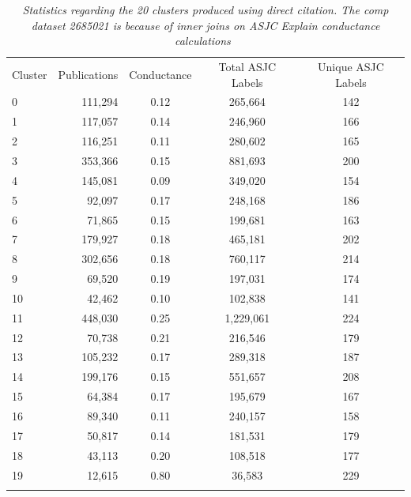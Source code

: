 \begin{table}[ht]
\caption{\emph{Statistics regarding the 20 clusters produced using direct citation. The \emph{comp} dataset 
2685021 is because of inner joins on ASJC Explain conductance calculations~\cite{shun_parallel_2016}}}
\label{tab:1}       
\begin{tabular}{lrccc}
\hline\noalign{\smallskip}
Cluster & Publications & Conductance & Total ASJC Labels & Unique ASJC Labels\\
\noalign{\smallskip}\hline\noalign{\smallskip}
0 & 111,294 & 0.12 & 265,664 & 142 \\ 
1 & 117,057 & 0.14 & 246,960 & 166 \\ 
2 & 116,251 & 0.11 & 280,602 & 165 \\ 
3 & 353,366 & 0.15 & 881,693 & 200 \\ 
4 & 145,081 & 0.09 & 349,020 & 154 \\ 
5 & 92,097 & 0.17 & 248,168 & 186 \\ 
6 & 71,865 & 0.15 & 199,681 & 163 \\ 
7 & 179,927 & 0.18 & 465,181 & 202 \\ 
8 & 302,656 & 0.18 & 760,117 & 214 \\ 
9 & 69,520 & 0.19 & 197,031 & 174 \\ 
10 & 42,462 & 0.10 & 102,838 & 141 \\ 
11 & 448,030 & 0.25 & 1,229,061 & 224 \\ 
12 & 70,738 & 0.21 & 216,546 & 179 \\ 
13 & 105,232 & 0.17 & 289,318 & 187 \\ 
14 & 199,176 & 0.15 & 551,657 & 208 \\ 
15 & 64,384 & 0.17 & 195,679 & 167 \\ 
16 & 89,340 & 0.11 & 240,157 & 158 \\ 
17 & 50,817 & 0.14 & 181,531 & 179 \\ 
18 & 43,113 & 0.20 & 108,518 & 177 \\ 
19 & 12,615 & 0.80 & 36,583 & 229 \\ \noalign{\smallskip}\hline
\end{tabular}
\end{table}
\newpage



%
%


